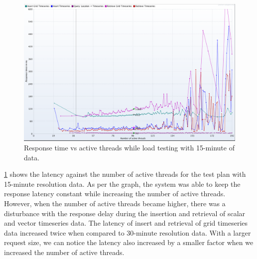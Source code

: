 \begin{figure}[htp]
    \centering
    \includegraphics[width=1.0\textwidth]{results/obs/all/obs_all_15m_response_times_vs_threads.png}
    \caption{Response time vs active threads while load testing with 15-minute of data.}
    \label{fi:test_obs_all_15m_response_vs_threads}
\end{figure}

\cref{fi:test_obs_all_15m_response_vs_threads} shows the latency against the number of active threads for the test plan with 15-minute resolution data. As per the graph, the system was able to keep the response latency constant while increasing the number of active threads. However, when the number of active threads became higher, there was a disturbance with the response delay during the insertion and retrieval of scalar and vector timeseries data.  The latency of insert and retrieval of grid timeseries data increased twice when compared to 30-minute resolution data. With a larger request size, we can notice the latency also increased by a smaller factor when we increased the number of active threads. 

